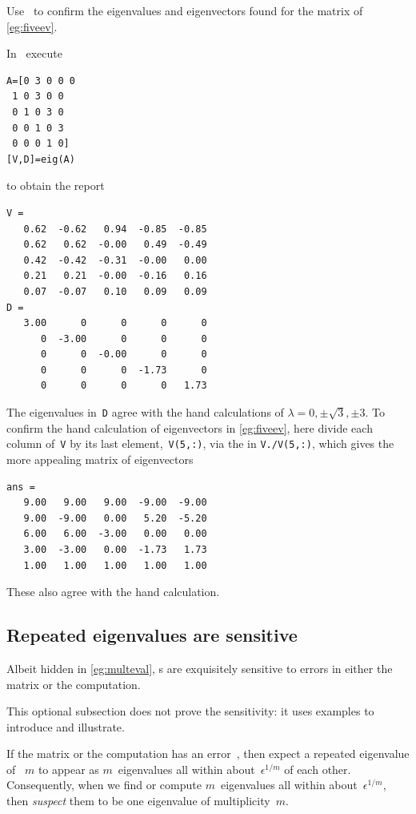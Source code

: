 \begin{example} \label{eg:fiveevm}
Use \script\ to confirm the eigenvalues and eigenvectors found for the matrix of \autoref{eg:fiveev}.
\begin{solution} 
In \script\ execute
\begin{verbatim}
A=[0 3 0 0 0
 1 0 3 0 0
 0 1 0 3 0
 0 0 1 0 3
 0 0 0 1 0]
[V,D]=eig(A)
\end{verbatim}
\setbox\ajrqrbox\hbox{}%
\marginajrbox%
to obtain the report \twodp
\begin{verbatim}
V =
   0.62  -0.62   0.94  -0.85  -0.85
   0.62   0.62  -0.00   0.49  -0.49
   0.42  -0.42  -0.31  -0.00   0.00
   0.21   0.21  -0.00  -0.16   0.16
   0.07  -0.07   0.10   0.09   0.09
D =
   3.00      0      0      0      0
      0  -3.00      0      0      0
      0      0  -0.00      0      0
      0      0      0  -1.73      0
      0      0      0      0   1.73
\end{verbatim}
The eigenvalues in~\verb|D| agree with the hand calculations of \(\lambda=0,\pm\sqrt3,\pm3\).
To confirm the hand calculation of eigenvectors in \autoref{eg:fiveev}, here divide each column of~\verb|V| by its last element,~\verb|V(5,:)|, via the  in \verb|V./V(5,:)|, which gives the more appealing matrix of eigenvectors \twodp
\begin{verbatim}
ans =
   9.00   9.00   9.00  -9.00  -9.00
   9.00  -9.00   0.00   5.20  -5.20
   6.00   6.00  -3.00   0.00   0.00
   3.00  -3.00   0.00  -1.73   1.73
   1.00   1.00   1.00   1.00   1.00
\end{verbatim}
These also agree with the hand calculation.
\end{solution}
\end{example}







\subsection{Repeated eigenvalues are sensitive}
\label{sec:reas}



Albeit hidden in \autoref{eg:multeval}, s are exquisitely sensitive to errors in either the matrix or the computation.
\begin{aside}
This optional subsection does not prove the sensitivity: it uses examples to introduce and illustrate.
\end{aside}
If the matrix or the computation has an error~\idx{$\epsilon$}, then expect a repeated eigenvalue of ~\(m\) to appear as \(m\)~eigenvalues all within about~\(\epsilon^{1/m}\) of each other.
Consequently, when we find or compute \(m\)~eigenvalues all within about~\(\epsilon^{1/m}\), then \emph{suspect} them to be one eigenvalue of multiplicity~\(m\).

